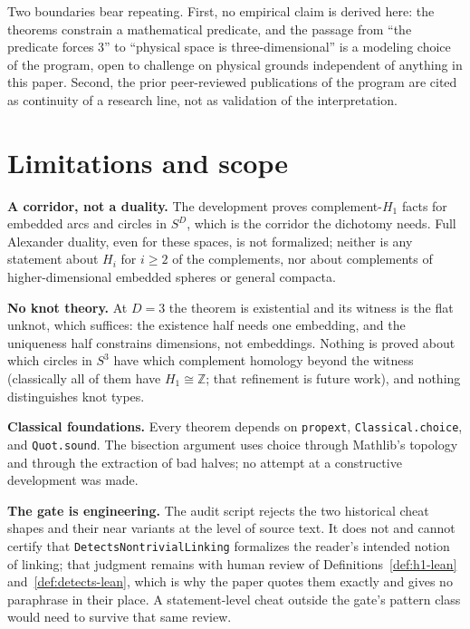 \documentclass[11pt]{article}
\theoremstyle{definition}
\newcommand{\Z}{\mathbb{Z}}
\newcommand{\Sph}[1]{S^{#1}}
\newcommand{\lean}[1]{\texttt{#1}}
\begin{document}
Two boundaries bear repeating. First, no empirical claim is derived here: the theorems constrain a mathematical predicate, and the passage from ``the predicate forces $3$'' to ``physical space is three-dimensional'' is a modeling choice of the program, open to challenge on physical grounds independent of anything in this paper. Second, the prior peer-reviewed publications of the program \cite{rs-cost, rs-geometry, rs-convex, rs-coherent, rs-hessian} are cited as continuity of a research line, not as validation of the interpretation.

\section{Limitations and scope}
\label{sec:limitations}

\textbf{A corridor, not a duality.} The development proves complement-$H_1$ facts for embedded arcs and circles in $\Sph{D}$, which is the corridor the dichotomy needs. Full Alexander duality, even for these spaces, is not formalized; neither is any statement about $H_i$ for $i \geq 2$ of the complements, nor about complements of higher-dimensional embedded spheres or general compacta.

\textbf{No knot theory.} At $D = 3$ the theorem is existential and its witness is the flat unknot, which suffices: the existence half needs one embedding, and the uniqueness half constrains dimensions, not embeddings. Nothing is proved about which circles in $\Sph{3}$ have which complement homology beyond the witness (classically all of them have $H_1 \cong \Z$; that refinement is future work), and nothing distinguishes knot types.

\textbf{Classical foundations.} Every theorem depends on \lean{propext}, \lean{Classical.choice}, and \lean{Quot.sound}. The bisection argument uses choice through Mathlib's topology and through the extraction of bad halves; no attempt at a constructive development was made.

\textbf{The gate is engineering.} The audit script rejects the two historical cheat shapes and their near variants at the level of source text. It does not and cannot certify that \lean{DetectsNontrivialLinking} formalizes the reader's intended notion of linking; that judgment remains with human review of Definitions~\ref{def:h1-lean} and~\ref{def:detects-lean}, which is why the paper quotes them exactly and gives no paraphrase in their place. A statement-level cheat outside the gate's pattern class would need to survive that same review.
\end{document}
